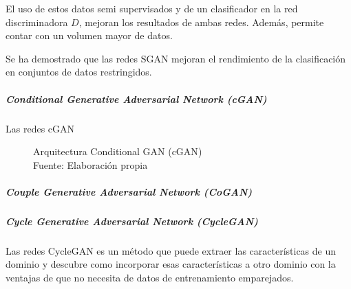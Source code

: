 El uso de estos datos semi supervisados y de un clasificador en la red discriminadora ${D}$, mejoran los resultados de ambas redes. Además, permite contar con un volumen mayor de datos.

Se ha demostrado que las redes \gls{SGAN} mejoran el rendimiento de la clasificación en conjuntos de datos restringidos.




\subparagraph*{Conditional Generative Adversarial Network (cGAN)}
Las redes \gls{cGAN} \cite{cGAN-zheng2021continuous,cGAN-li2022ttscgan,cGAN}







\begin{figure}[H]
    \centering
    \centerline{}
    \caption{Arquitectura Conditional GAN ({cGAN})\\Fuente: Elaboración propia}
    \label{fig:}
\end{figure}


\subparagraph*{Couple Generative Adversarial Network (CoGAN)}


\subparagraph*{Cycle Generative Adversarial Network (CycleGAN)}
Las redes \gls{CycleGAN} \cite{CycleGAN-zhu2020unpaired} es un método que puede extraer las características de un dominio y descubre como incorporar esas características a otro dominio con la ventajas de que no necesita de datos de entrenamiento emparejados.

